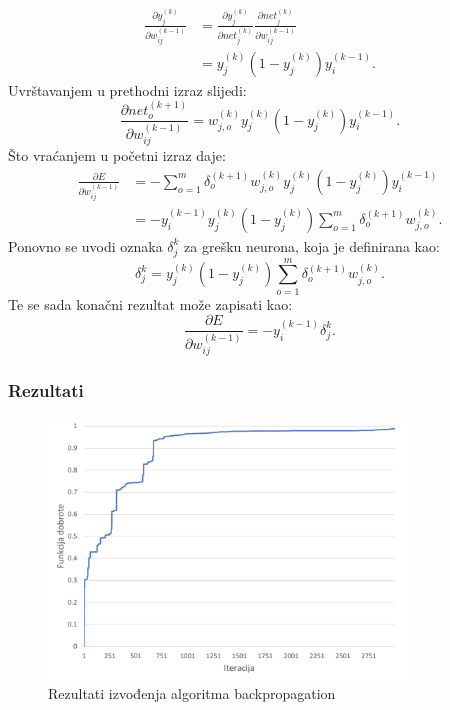 \documentclass[times, utf8, zavrsni, numeric]{fer}
\begin{document}
\begin{equation*}
\begin{split}
    \frac{\partial y_j^{(k)}}{\partial w_{ij}^{(k-1)}}
        & = \frac{\partial y_j^{(k)}}{\partial net_{j}^{(k)}}
            \frac{\partial net_{j}^{(k)}}{\partial w_{ij}^{(k-1)}}\\
        & = y_j^{(k)} (1 - y_j^{(k)}) y_i^{(k - 1)}.
\end{split}
\end{equation*}
Uvrštavanjem u prethodni izraz slijedi:
\[
    \frac{\partial net_o^{(k + 1)}}{\partial w_{ij}^{(k-1)}}
        = w_{j,o}^{(k)}y_j^{(k)} (1 - y_j^{(k)}) y_i^{(k - 1)}.
\]
Što vraćanjem u početni izraz daje:
\begin{equation*}
\begin{split}
    \frac{\partial E}{\partial w_{ij}^{(k-1)}}
        & = -\displaystyle\sum_{o = 1}^m\delta_o^{(k+1)}w_{j,o}^{(k)}y_j^{(k)} (1 - y_j^{(k)}) y_i^{(k - 1)}\\
        & = -y_i^{(k - 1)} y_j^{(k)} (1 - y_j^{(k)})\displaystyle\sum_{o = 1}^m\delta_o^{(k+1)}w_{j,o}^{(k)}.
\end{split}
\end{equation*}
Ponovno se uvodi oznaka $\delta_j^{k}$ za grešku neurona, koja je definirana kao:
\[
    \delta_j^{k} = y_j^{(k)} (1 - y_j^{(k)})\displaystyle\sum_{o = 1}^m\delta_o^{(k+1)}w_{j,o}^{(k)}.
\]
Te se sada konačni rezultat može zapisati kao:
\[
    \frac{\partial E}{\partial w_{ij}^{(k-1)}} =
    -y_i^{(k - 1)}\delta_j^{k}.
\]

\subsubsection{Rezultati}
\begin{figure}[ht!]
    \centering
    \includegraphics[width=0.85\textwidth]{Images/Backprop.pdf}
    \captionsetup{justification=centering}
    \caption{Rezultati izvođenja algoritma backpropagation}
    \label{fig:backprop}
\end{figure}
\end{document}
